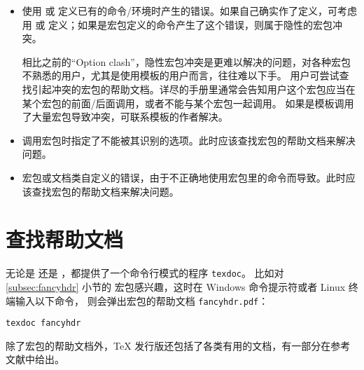 \begin{itemize}
\item {}

使用  或  定义已有的命令/环境时产生的错误。如果自己确实作了定义，可考虑用
 或  定义；如果是宏包定义的命令产生了这个错误，则属于隐性的宏包冲突。

相比之前的“Option clash”，隐性宏包冲突是更难以解决的问题，对各种宏包不熟悉的用户，尤其是使用模板的用户而言，往往难以下手。
用户可尝试查找引起冲突的宏包的帮助文档。详尽的手册里通常会告知用户这个宏包应当在某个宏包的前面/后面调用，或者不能与某个宏包一起调用。
如果是模板调用了大量宏包导致冲突，可联系模板的作者解决。

\item {}

调用宏包时指定了不能被其识别的选项。此时应该查找宏包的帮助文档来解决问题。

\item {}

宏包或文档类自定义的错误，由于不正确地使用宏包里的命令而导致。此时应该查找宏包的帮助文档来解决问题。

\end{itemize}

\section{查找帮助文档}\label{sec:texdoc}

无论是  还是 ，都提供了一个命令行模式的程序 \texttt{texdoc}。
比如对 \ref{subsec:fancyhdr} 小节的  宏包感兴趣，这时在 Windows 命令提示符或者 Linux 终端输入以下命令，
则会弹出宏包的帮助文档 \texttt{fancyhdr.pdf}：
\begin{verbatim}
texdoc fancyhdr
\end{verbatim}

除了宏包的帮助文档外，\TeX{} 发行版还包括了各类有用的文档，有一部分在参考文献中给出。


